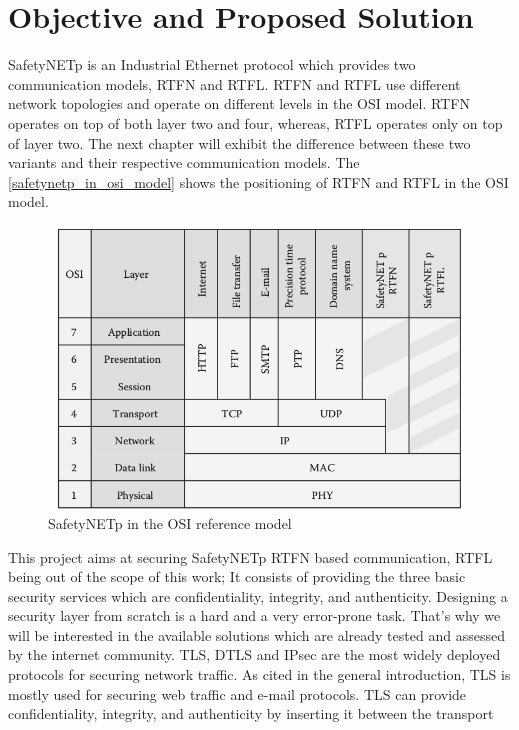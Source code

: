 \section{Objective and Proposed Solution}

SafetyNETp is an Industrial Ethernet protocol which provides two communication models, \ac{RTFN} and \ac{RTFL}.
\ac{RTFN} and \ac{RTFL} use different network topologies and operate on different
levels in the \ac{OSI} model. \ac{RTFN} operates on top of both layer two and four, whereas, \ac{RTFL} operates only on top of layer
two. The next chapter will exhibit the difference between these two variants and their respective communication models.
The \autoref{safetynetp_in_osi_model} shows the positioning of \ac{RTFN} and \ac{RTFL} in the \ac{OSI} model.

\begin{figure}[H]
\centering
\includegraphics[width=12cm,height=7.5cm]{figures/safetynetp/safetynetp_in_osi_model.png}
\caption[SafetyNETp in the OSI reference model]{SafetyNETp in the \ac{OSI} reference model \cite{pilzSafetyNETpForRealTimeEthernet}}\label{safetynetp_in_osi_model}
\end{figure}
This project aims at securing SafetyNETp RTFN based communication, RTFL being out of the scope of this work; It consists of providing the three basic
security services which are confidentiality, integrity, and authenticity.
Designing a security layer from scratch is a hard and a very error-prone task. That's why we will be interested in the
available solutions which are already tested and assessed by the internet community. \ac{TLS}, \ac{DTLS} and \ac{IPsec} are the most
widely deployed protocols for securing network traffic.
As cited in the general introduction, \ac{TLS} is mostly used for securing
web traffic and e-mail protocols. \ac{TLS} can provide confidentiality, integrity, and authenticity by inserting it between the transport
